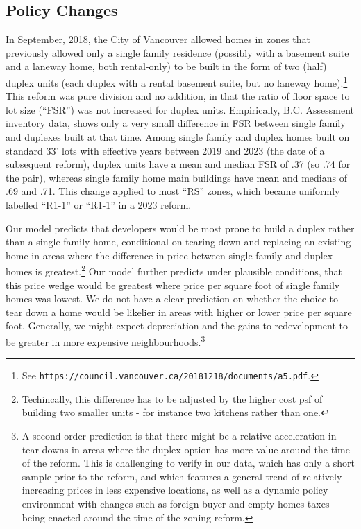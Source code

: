 \documentclass[12pt]{article}
\begin{document}
\subsection{Policy Changes}


In September, 2018, the City of Vancouver allowed homes in zones that previously allowed only a single family residence (possibly with a basement suite and a laneway home, both rental-only) to be built in the form of two (half) duplex units (each duplex with a rental basement suite, but no laneway home).\footnote{See \texttt{https://council.vancouver.ca/20181218/documents/a5.pdf}.} This reform was pure division and no addition, in that the ratio of floor space to lot size (``FSR'') was not increased for duplex units. Empirically, B.C. Assessment inventory data, shows only a very small difference in FSR between single family and duplexes built at that time. Among single family and duplex homes built on standard 33' lots with effective years between 2019 and 2023 (the date of a subsequent reform), duplex units have a mean and median FSR of .37 (so .74 for the pair), whereas single family home main buildings have mean and medians of .69 and .71. This change applied to most ``RS'' zones, which became uniformly labelled ``R1-1'' or ``R1-1'' in a 2023 reform.

Our model predicts that developers would be most prone to build a duplex rather than a single family home, conditional on tearing down and replacing an existing home in areas where the difference in price between single family and duplex homes is greatest.\footnote{Techincally, this difference has to be adjusted by the higher cost psf of building two smaller units - for instance two kitchens rather than one.} Our model further predicts under plausible conditions, that this price wedge would be greatest where price per square foot of single family homes was lowest. We do not have a clear prediction on whether the choice to tear down a home would be likelier in areas with higher or lower price per square foot. Generally, we might expect depreciation and the gains to redevelopment to be greater in more expensive neighbourhoods.\footnote{A second-order prediction is that there might be a relative acceleration in tear-downs in areas where the duplex option has more value around the time of the reform. This is challenging to verify in our data, which has only a short sample prior to the reform, and which features a general trend of relatively increasing prices in less expensive locations, as well as a dynamic policy environment with changes such as foreign buyer and empty homes taxes being enacted around the time of the zoning reform.}
\end{document}
